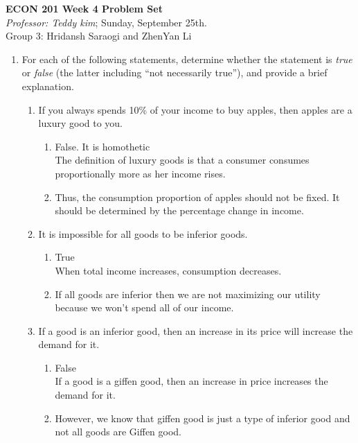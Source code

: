 \documentclass[11pt]{article}
\begin{document}
\begin{center}
\textbf{ECON 201 Week 4 Problem Set}\\
\textit {Professor: Teddy kim};  
Sunday, September 25th.
\\Group 3: Hridansh Saraogi and ZhenYan Li
\end{center}

\begin{enumerate}
\item For each of the following statements, determine whether
the statement is \emph{true} or \emph{false} (the latter including ``not necessarily true''), and provide a brief explanation.

    \begin{enumerate}
    \item If you always spends 10\% of your income to buy apples, then apples are a luxury good to you.
    \begin{enumerate}
        \item False. It is homothetic\\
        The definition of luxury goods is that a consumer consumes proportionally more as her income rises. \item Thus, the consumption proportion of apples should not be fixed. It should be determined by the percentage change in income.
    \end{enumerate}

    \item It is impossible for all goods to be inferior goods.
    \begin{enumerate}
        \item True\\
        When total income increases, consumption decreases.
        \item If all goods are inferior then we are not maximizing our utility because we won’t spend all of our income.
    \end{enumerate}

    \item If a good is an inferior good, then an increase in its price will increase the demand for it.
    \begin{enumerate}
        \item False\\
        If a good is a giffen good, then an increase in price increases the demand for it.
        \item However, we know that giffen good is just a type of inferior good and not all goods are Giffen good.
    \end{enumerate}


\end{enumerate}
\end{enumerate}
\end{document}
